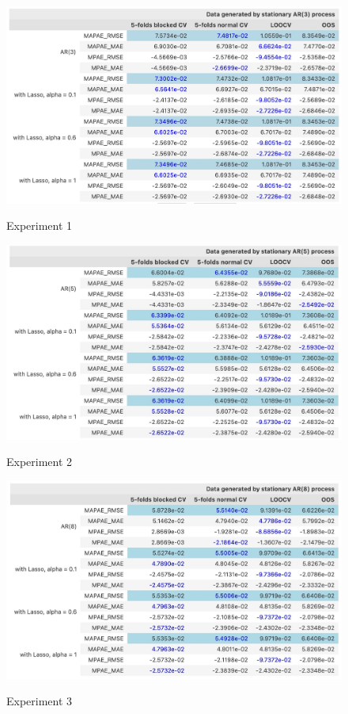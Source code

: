\documentclass[12pt, oneside]{amsart}
\theoremstyle{definition}
\theoremstyle{remark}
\numberwithin{equation}{section}
\begin{document}
\begin{figure}[hbt!]
    \caption{Experiment 1}
    \centering
    \includegraphics[scale=0.3]{Report/Figures/ar3_table.jpg}
    \label{ar3_table}
\end{figure}
\FloatBarrier

\begin{figure}[hbt!]
    \caption{Experiment 2}
    \centering
    \includegraphics[scale=0.6]{Report/Figures/ar5_table.jpg}
    \label{ar5_table}
\end{figure}
\FloatBarrier

\begin{figure}[hbt!]
    \caption{Experiment 3}
    \centering
    \includegraphics[scale=0.6]{Report/Figures/ar8_table.jpg}
    \label{ar8_table}
\end{figure}
\FloatBarrier
\end{document}
